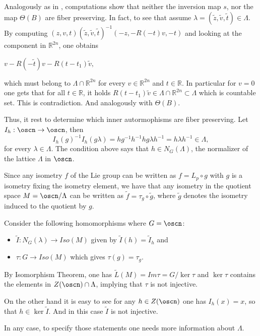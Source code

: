 \documentclass[11pt]{amsart}
\theoremstyle{plain}
\theoremstyle{definition}
\theoremstyle{remark}
\begin{document}
Analogously as in \cite{BOV}, computations show that neither the inversion map $s$, nor the map $\Theta(B)$ are fiber preserving.
In fact, to see that assume $\lambda=(\tilde{z},\tilde{v},\tilde{t})\in \Lambda$.  By computing 
		$(z,v,t)(\tilde{z},\tilde{v},\tilde{t})^{-1}(-z,-R(-t)v,-t)$ and looking at the component in $\mathbb R^{2n}$, one obtains 
				
		$v-R(-\tilde{t})v-R(t-t_1)\tilde{v},$ 
		
		which must belong to $\Lambda\cap \mathbb R^{2n}$ for every $v\in  \mathbb R^{2n}$ and $t\in \mathbb R$. In particular for $v=0$ one gets that for all $t\in \mathbb R$, it holds $R(t-t_1)\tilde{v}\in \Lambda\cap \mathbb R^{2n} \subset \Lambda$ which is countable set. This is contradiction. And analogously with $\Theta(B)$. 

Thus, it rest to determine which inner autormophisms are fiber preserving. Let $I_h: \oscn \to \oscn$, then
$$I_h(g)^{-1}I_h(g\lambda)=hg^{-1}h^{-1} hg\lambda h^{-1}= h\lambda h^{-1}\in\Lambda,$$ for every $\lambda\in \Lambda$. The condition above says that  
  $h \in N_G(\Lambda)$, the normalizer of the lattice $\Lambda$ in $\oscn$. 

Since any isometry $f$ of the Lie group can be written as $f=L_p\circ g$ with $g$ is a isometry fixing the isometry element, we have that any isometry in the quotient space $M=\oscn/\Lambda$ can be written as $\tilde{f}=\tau_g\circ \tilde{g}$, where $\tilde{g}$ denotes the isometry induced to the quotient by $g$. 



Consider the following homomorphisms where $G=\oscn$:
\begin{itemize}
	\item $\widetilde{I}:N_G(\lambda) \to Iso(M)$ given by $\widetilde{I}(h)=\widetilde{I}_h$ and
	\item $\tau: G \to Iso(M)$ which gives $\tau(g)=\tau_g$.
\end{itemize}

By Isomorphism Theorem, one has $\tilde{L}(M)=Im\tau=G/\ker\tau$ and $\ker\tau$ contains the elements in $Z(\oscn)\cap \Lambda$, implying that $\tau$ is not injective. 

On the other hand it is easy to see for any $h\in Z(\oscn)$ one has $I_h(x)=x$, so that $h\in \ker \widetilde{I}$. And in this case $\widetilde{I}$ is not injective. 

In any case, to specify those statements one needs more information about $\Lambda$. 
\end{document}
